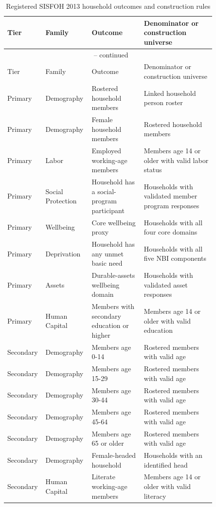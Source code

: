 \begingroup
\small
\begin{longtable}{p{0.10\linewidth}p{0.18\linewidth}p{0.24\linewidth}p{0.33\linewidth}}
\caption{Registered SISFOH 2013 household outcomes and construction rules}
\label{tab:rd_outcome_registry_2013_household} \\
\toprule
Tier & Family & Outcome & Denominator or construction universe \\
\midrule
\endfirsthead
\multicolumn{4}{c}{\tablename\ \thetable{} -- continued} \\
\toprule
Tier & Family & Outcome & Denominator or construction universe \\
\midrule
\endhead
Primary & Demography & Rostered household members & Linked household person roster \\
Primary & Demography & Female household members & Rostered household members \\
Primary & Labor & Employed working-age members & Members age 14 or older with valid labor status \\
Primary & Social Protection & Household has a social-program participant & Households with validated member program responses \\
Primary & Wellbeing & Core wellbeing proxy & Households with all four core domains \\
Primary & Deprivation & Household has any unmet basic need & Households with all five NBI components \\
Primary & Assets & Durable-assets wellbeing domain & Households with validated asset responses \\
Primary & Human Capital & Members with secondary education or higher & Members age 14 or older with valid education \\
Secondary & Demography & Members age 0-14 & Rostered members with valid age \\
Secondary & Demography & Members age 15-29 & Rostered members with valid age \\
Secondary & Demography & Members age 30-44 & Rostered members with valid age \\
Secondary & Demography & Members age 45-64 & Rostered members with valid age \\
Secondary & Demography & Members age 65 or older & Rostered members with valid age \\
Secondary & Demography & Female-headed household & Households with an identified head \\
Secondary & Human Capital & Literate working-age members & Members age 14 or older with valid literacy \\

\end{longtable}
